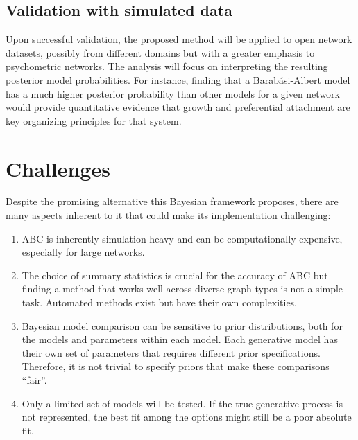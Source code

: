 \documentclass[stu,12pt,floatsintext]{apa7}
\begin{document}
\subsection{Validation with simulated data}

Upon successful validation, the proposed method will be applied to open network datasets, possibly from different domains but with a greater emphasis to psychometric networks. The analysis will focus on interpreting the resulting posterior model probabilities. For instance, finding that a Barabási-Albert model has a much higher posterior probability than other models for a given network would provide quantitative evidence that growth and preferential attachment are key organizing principles for that system.


\section{Challenges}

Despite the promising alternative this Bayesian framework proposes, there are many aspects inherent to it that could make its implementation challenging:

\begin{enumerate}

	\item ABC is inherently simulation-heavy and can be computationally expensive, especially for large networks.
	\item The choice of summary statistics is crucial for the accuracy of ABC but finding a method that works well across diverse graph types is not a simple task. Automated methods exist but have their own complexities.
	\item Bayesian model comparison can be sensitive to prior distributions, both for the models and parameters within each model. Each generative model has their own set of parameters that requires different prior specifications. Therefore, it is not trivial to specify priors that make these comparisons ``fair''.
	\item Only a limited set of models will be tested. If the true generative process is not represented, the best fit among the options might still be a poor absolute fit.

\end{enumerate}

\printbibliography
\end{document}
